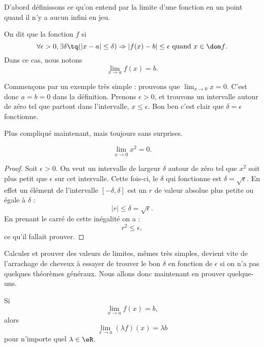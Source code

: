 D'abord définissons ce qu'on entend par la limite d'une fonction en un point quand il n'y a aucun infini en jeu.
\begin{definition}      \label{DefLimPointSansInfini}
 On dit que la fonction $f$  si 
\[ 
  \forall \epsilon>0,\exists\delta\tq (| x-a |\leq\delta)\Rightarrow | f(x)-b |\leq \epsilon\text{ quand $x\in\dom f$}.
\]
Dans ce cas, nous notons
\begin{equation}
\lim_{x\to a}f(x)=b.
\end{equation} 
\end{definition}

Commençons par un exemple très simple : prouvons que $\lim_{x\to 0}x=0$. C'est donc $a=b=0$ dans la définition. Prenons $\epsilon>0$, et trouvons un intervalle autour de zéro tel que partout dans l'intervalle, $x\leq \epsilon$. Bon ben c'est clair que $\delta=\epsilon$ fonctionne.

Plus compliqué maintenant, mais toujours sans surprises.

\begin{proposition}
\[ 
  \lim_{x\to 0}x^2=0.
\]

\end{proposition}

\begin{proof}
Soit $\epsilon>0$. On veut un intervalle de largeur $\delta$ autour de zéro tel que $x^2$ soit plus petit que $\epsilon$ sur cet intervalle. Cette fois-ci, le $\delta$ qui fonctionne est $\delta=\sqrt{\epsilon}$. En effet un élément de l'intervalle $[-\delta,\delta]$ est un $r$ de valeur absolue plus petite ou égale à $\delta$ : 
\[ 
| r |\leq\delta=\sqrt{\epsilon}.
\]
En prenant le carré de cette inégalité on a :
\[ 
  r^2\leq\epsilon,
\]
ce qu'il fallait prouver.
\end{proof}


Calculer et prouver des valeurs de limites, mêmes très simples, devient vite de l'arrachage de cheveux à essayer de trouver le bon $\delta$ en fonction de $\epsilon$ si on n'a pas quelques théorèmes généraux. Nous allons donc maintenant en prouver quelque-uns.

\begin{theorem}     \label{ThoLimLinMul}
    Si
    \begin{equation} \label{Eqhypmullimlin}
      \lim_{x\to a}f(x)=b,
    \end{equation}
    alors
    \begin{equation} \label{Eqbutmultlim}
      \lim_{x\to a}(\lambda f)(x)=\lambda b
    \end{equation}
    pour n'importe quel $\lambda\in\eR$.
\end{theorem}


